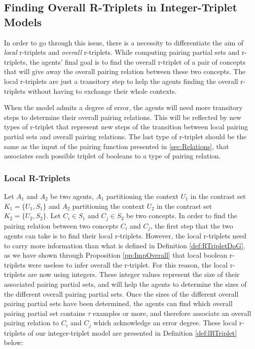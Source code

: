 \subsection{Finding Overall R-Triplets in Integer-Triplet Models}

In order to go through this issue, there is a necessity to differentiate the aim of \emph{local} r-triplets and \emph{overall} r-triplets. While computing pairing partial sets and r-triplets, the agents' final goal is to find the overall r-triplet of a pair of concepts that will give away the overall pairing relation between these two concepts. The local r-triplets are just a transitory step to help the agents finding the overall r-triplets without having to exchange their whole contexts.

When the model admits a degree of error, the agents will need more transitory steps to determine their overall pairing relations. This will be reflected by new types of r-triplet that represent new steps of the transition between local pairing partial sets and overall pairing relations. The last type of r-triplet should be the same as the input of the pairing function presented in \ref{sec:Relations}, that associates each possible triplet of booleans to a type of pairing relation.

\subsubsection{Local R-Triplets}

Let $A_{1}$ and $A_{2}$ be two  agents, $A_{1}$ partitioning the context $U_{1}$ in the contrast set $K_{1} = \{ U_{1}, S_{1} \}$ and $A_{2}$ partitioning the context $U_{2}$ in the contrast set $K_{2} = \{ U_{2}, S_{2}\}$. Let $C_{i} \in S_{1}$ and $C_{j} \in S_{2}$ be two concepts. In order to find the pairing relation between two concepts $C_{i}$ and $C_{j}$, the first step that the two agents can take is to find their local r-triplets. However, the local r-triplets need to carry more information than what is defined in Definition \ref{def:RTripletDoG}, as we have shown through Proposition \ref{pp:ImpOverall} that local boolean r-triplets were useless to infer overall the r-triplet. For this reason, the local r-triplets are now using integers. These integer values represent the size of their associated pairing partial sets, and will help the agents to determine the sizes of the different overall pairing partial sets. Once the sizes of the different overall pairing partial sets have been determined, the agents can find which overall pairing partial set contains $\tau$ examples or more, and therefore associate an overall pairing relation to $C_{i}$ and $C_{j}$ which acknowledge an error degree. These local r-triplets of our integer-triplet model are presented in Definition \ref{def:lRTriplet} below:

